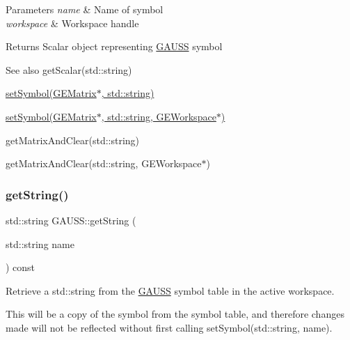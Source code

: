 \begin{DoxyParams}{Parameters}
{\em name} & Name of symbol \\
\hline
{\em workspace} & Workspace handle \\
\hline
\end{DoxyParams}
\begin{DoxyReturn}{Returns}
Scalar object representing \hyperlink{class_g_a_u_s_s}{G\+A\+U\+SS} symbol
\end{DoxyReturn}
\begin{DoxySeeAlso}{See also}
get\+Scalar(std\+::string) 

\hyperlink{class_g_a_u_s_s_ab51cbcd5a66ba3355f52bf10bf31f7e3}{set\+Symbol(\+G\+E\+Matrix$\ast$, std\+::string)} 

\hyperlink{class_g_a_u_s_s_a23181c31041882ce839f816ce56e1231}{set\+Symbol(\+G\+E\+Matrix$\ast$, std\+::string, G\+E\+Workspace$\ast$)} 

get\+Matrix\+And\+Clear(std\+::string) 

get\+Matrix\+And\+Clear(std\+::string, G\+E\+Workspace$\ast$) 
\end{DoxySeeAlso}
\mbox{\label{class_g_a_u_s_s_a3a80b7cf90a447739efe07360e5449f7}} 
\subsubsection{\texorpdfstring{get\+String()}{getString()}\hspace{0.1cm}{\footnotesize\ttfamily [1/2]}}
{\footnotesize\ttfamily std\+::string G\+A\+U\+S\+S\+::get\+String (\begin{DoxyParamCaption}\item[{std\+::string}]{name }\end{DoxyParamCaption}) const}



Retrieve a std\+::string from the \hyperlink{class_g_a_u_s_s}{G\+A\+U\+SS} symbol table in the active workspace. 

This will be a copy of the symbol from the symbol table, and therefore changes made will not be reflected without first calling set\+Symbol(std\+::string, name).


